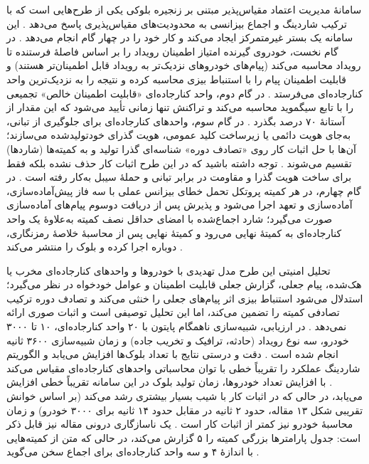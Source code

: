 سامانهٔ مدیریت اعتماد مقیاس‌پذیر مبتنی بر زنجیره بلوکی یکی از طرح‌هایی است که با ترکیب شاردینگ و اجماع بیزانسی به محدودیت‌های مقیاس‌پذیری پاسخ می‌دهد \cite{ghovanlooyghajarSBTMSScalableBlockchain2021}. این سامانه یک بستر غیرمتمرکز ایجاد می‌کند و کار خود را در چهار گام انجام می‌دهد \cite{ghovanlooyghajarSBTMSScalableBlockchain2021}. در گام نخست، خودروی گیرنده امتیاز اطمینان رویداد را بر اساس فاصلهٔ فرستنده تا رویداد محاسبه می‌کند (پیام‌های خودروهای نزدیک‌تر به رویداد قابل اطمینان‌تر هستند) و قابلیت اطمینان پیام را با استنباط بیزی محاسبه کرده و نتیجه را به نزدیک‌ترین واحد کنارجاده‌ای می‌فرستد \cite{ghovanlooyghajarSBTMSScalableBlockchain2021}. در گام دوم، واحد کنارجاده‌ای «قابلیت اطمینان خالص» تجمیعی را با تابع سیگموید محاسبه می‌کند و تراکنش تنها زمانی تأیید می‌شود که این مقدار از آستانهٔ ۷۰ درصد بگذرد \cite{ghovanlooyghajarSBTMSScalableBlockchain2021}. در گام سوم، واحدهای کنارجاده‌ای برای جلوگیری از تبانی، به‌جای هویت دائمی یا زیرساخت کلید عمومی، هویت گذرای خودتولیدشده می‌سازند؛ آن‌ها با حل اثبات کار روی «تصادف دوره» شناسه‌ای گذرا تولید و به کمیته‌ها (شاردها) تقسیم می‌شوند \cite{ghovanlooyghajarSBTMSScalableBlockchain2021}. توجه داشته باشید که در این طرح اثبات کار حذف نشده بلکه فقط برای ساخت هویت گذرا و مقاومت در برابر تبانی و حملهٔ سیبل به‌کار رفته است \cite{ghovanlooyghajarSBTMSScalableBlockchain2021}. در گام چهارم، در هر کمیته پروتکل تحمل خطای بیزانس عملی با سه فاز پیش‌آماده‌سازی، آماده‌سازی و تعهد اجرا می‌شود و پذیرش پس از دریافت دو‌سوم پیام‌های آماده‌سازی صورت می‌گیرد؛ شارد اجماع‌شده با امضای حداقل نصف کمیته به‌علاوهٔ یک واحد کنارجاده‌ای به کمیتهٔ نهایی می‌رود و کمیتهٔ نهایی پس از محاسبهٔ خلاصهٔ رمزنگاری، دوباره  اجرا کرده و بلوک را منتشر می‌کند \cite{ghovanlooyghajarSBTMSScalableBlockchain2021}.

تحلیل امنیتی این طرح مدل تهدیدی با خودروها و واحدهای کنارجاده‌ای مخرب یا هک‌شده، پیام جعلی، گزارش جعلی قابلیت اطمینان و عوامل خودخواه در نظر می‌گیرد؛ استدلال می‌شود استنباط بیزی اثر پیام‌های جعلی را خنثی می‌کند و تصادف دوره ترکیب تصادفی کمیته را تضمین می‌کند، اما این تحلیل توصیفی است و اثبات صوری ارائه نمی‌دهد \cite{ghovanlooyghajarSBTMSScalableBlockchain2021}. در ارزیابی، شبیه‌سازی ناهمگام پایتون با ۲۰ واحد کنارجاده‌ای، ۱۰ تا ۳۰۰۰ خودرو، سه نوع رویداد (حادثه، ترافیک و تخریب جاده) و زمان شبیه‌سازی ۳۶۰۰ ثانیه انجام شده است \cite{ghovanlooyghajarSBTMSScalableBlockchain2021}. دقت و درستی نتایج با تعداد بلوک‌ها افزایش می‌یابد و الگوریتم شاردینگ عملکرد را تقریباً خطی با توان محاسباتی واحدهای کنارجاده‌ای مقیاس می‌کند \cite{ghovanlooyghajarSBTMSScalableBlockchain2021}. با افزایش تعداد خودروها، زمان تولید بلوک در این سامانه تقریباً خطی افزایش می‌یابد، در حالی که در اثبات کار با شیب بسیار بیشتری رشد می‌کند (بر اساس خوانش تقریبی شکل ۱۳ مقاله، حدود ۲ ثانیه در مقابل حدود ۱۴ ثانیه برای ۳۰۰۰ خودرو) و زمان محاسبهٔ خودرو نیز کمتر از اثبات کار است \cite{ghovanlooyghajarSBTMSScalableBlockchain2021}. یک ناسازگاری درونی مقاله نیز قابل ذکر است: جدول پارامترها بزرگی کمیته را ۵ گزارش می‌کند، در حالی که متن از کمیته‌هایی با اندازهٔ ۴ و سه واحد کنارجاده‌ای برای اجماع سخن می‌گوید \cite{ghovanlooyghajarSBTMSScalableBlockchain2021}.

